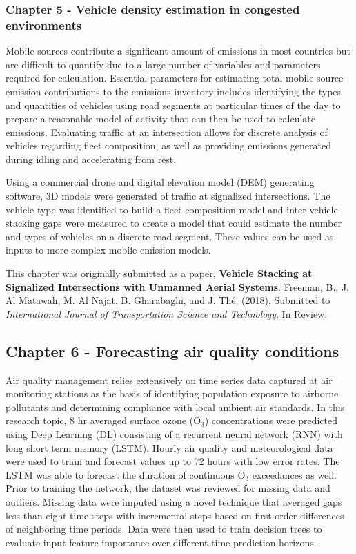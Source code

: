 \subsubsection*{Chapter 5 - Vehicle density estimation in congested environments}

Mobile sources contribute a significant amount of emissions in most countries but are difficult to quantify due to a large number of variables and parameters required for calculation. Essential parameters for estimating total mobile source emission contributions to the emissions inventory includes identifying the types and quantities of vehicles using road segments at particular times of the day to prepare a reasonable model of activity that can then be used to calculate emissions. Evaluating traffic at an intersection allows for discrete analysis of vehicles regarding fleet composition, as well as providing emissions generated during idling and accelerating from rest.

Using a commercial drone and digital elevation model (DEM) generating software, 3D models were generated of traffic at signalized intersections. The vehicle type was identified to build a fleet composition model and inter-vehicle stacking gaps were measured to create a model that could estimate the number and types of vehicles on a discrete road segment. These values can be used as inputs to more complex mobile emission models.

This chapter was originally submitted as a paper, \textbf{Vehicle Stacking at Signalized Intersections with Unmanned Aerial Systems}.  Freeman,  B., J. Al Matawah, M. Al Najat, B. Gharabaghi, and J.  Th\'e, (2018). Submitted to \textit{International Journal of Transportation Science and Technology}, In Review.

\subsection*{Chapter 6 - Forecasting air quality conditions}

Air quality management relies extensively on time series data captured at air monitoring stations as the basis of identifying population exposure to airborne pollutants and determining compliance with local ambient air standards. In this research topic, 8 hr averaged surface ozone (O$_{3}$) concentrations were predicted using Deep Learning (DL) consisting of a recurrent neural network (RNN) with long short term memory (LSTM). Hourly air quality and meteorological data were used to train and forecast values up to 72 hours with low error rates. The LSTM was able to forecast the duration of continuous O$_{3}$ exceedances as well. Prior to training the network, the dataset was reviewed for missing data and outliers. Missing data were imputed using a novel technique that averaged gaps less than eight time steps with incremental steps based on first-order differences of neighboring time periods. Data were then used to train decision trees to evaluate input feature importance over different time prediction horizons. 

